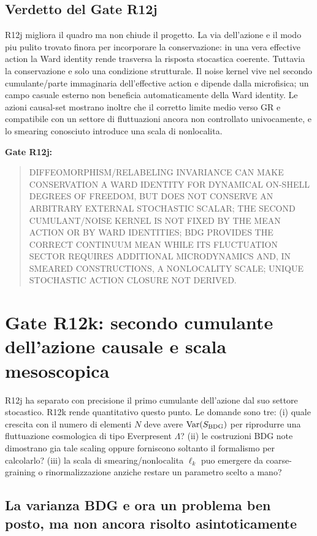 \documentclass[11pt,a4paper]{article}
\begin{document}
\subsection{Verdetto del Gate R12j}

R12j migliora il quadro ma non chiude il progetto. La via dell'azione e il modo piu pulito trovato finora per incorporare la conservazione: in una vera effective action la Ward identity rende trasversa la risposta stocastica coerente. Tuttavia la conservazione e solo una condizione strutturale. Il noise kernel vive nel secondo cumulante/parte immaginaria dell'effective action e dipende dalla microfisica; un campo casuale esterno non beneficia automaticamente della Ward identity. Le azioni causal-set mostrano inoltre che il corretto limite medio verso GR e compatibile con un settore di fluttuazioni ancora non controllato univocamente, e lo smearing conosciuto introduce una scala di nonlocalita.

\textbf{Gate R12j:}
\begin{quote}\small\textsf{DIFFEOMORPHISM/RELABELING INVARIANCE CAN MAKE CONSERVATION A WARD IDENTITY FOR DYNAMICAL ON-SHELL DEGREES OF FREEDOM, BUT DOES NOT CONSERVE AN ARBITRARY EXTERNAL STOCHASTIC SCALAR; THE SECOND CUMULANT/NOISE KERNEL IS NOT FIXED BY THE MEAN ACTION OR BY WARD IDENTITIES; BDG PROVIDES THE CORRECT CONTINUUM MEAN WHILE ITS FLUCTUATION SECTOR REQUIRES ADDITIONAL MICRODYNAMICS AND, IN SMEARED CONSTRUCTIONS, A NONLOCALITY SCALE; UNIQUE STOCHASTIC ACTION CLOSURE NOT DERIVED}.\end{quote}


\section{Gate R12k: secondo cumulante dell'azione causale e scala mesoscopica}

R12j ha separato con precisione il primo cumulante dell'azione dal suo settore stocastico. R12k rende quantitativo questo punto. Le domande sono tre: (i) quale crescita con il numero di elementi $N$ deve avere $\mathrm{Var}(S_{\rm BDG})$ per riprodurre una fluttuazione cosmologica di tipo Everpresent $\Lambda$? (ii) le costruzioni BDG note dimostrano gia tale scaling oppure forniscono soltanto il formalismo per calcolarlo? (iii) la scala di smearing/nonlocalita $\ell_k$ puo emergere da coarse-graining o rinormalizzazione anziche restare un parametro scelto a mano?

\subsection{La varianza BDG e ora un problema ben posto, ma non ancora risolto asintoticamente}
\end{document}
